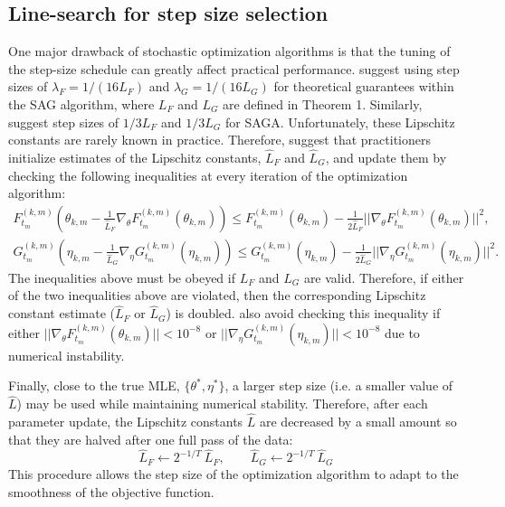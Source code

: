 
\subsection{Line-search for step size selection}
\label{subsec:est_L}

One major drawback of stochastic optimization algorithms is that the tuning of the step-size schedule can greatly affect practical performance. \citet{Schmidt:2017} suggest using step sizes of $\lambda_F = 1/(16L_F)$ and $\lambda_G = 1/(16L_G)$ for theoretical guarantees within the SAG algorithm, where $L_F$ and $L_G$ are defined in Theorem 1. Similarly, \citet{Defazio:2014} suggest step sizes of $1/3L_F$ and $1/3L_G$ for SAGA. Unfortunately, these Lipschitz constants are rarely known in practice. Therefore, \citet{Schmidt:2017} suggest that practitioners initialize estimates of the Lipschitz constants, $\hat L_F$ and $\hat L_G$, and update them by checking the following inequalities at every iteration of the optimization algorithm:
%
\begin{gather}
    F^{(k,m)}_{t_m}\left(\theta_{k,m} - \frac{1}{\hat L_F}\nabla_\theta F^{(k,m)}_{t_m}(\theta_{k,m})\right) \leq F^{(k,m)}_{t_m}(\theta_{k,m}) - \frac{1}{2 \hat L_F} || \nabla_\theta F^{(k,m)}_{t_m}(\theta_{k,m}) ||^2,
    \label{ineq:F} \\
    G^{(k,m)}_{t_m}\left(\eta_{k,m} - \frac{1}{\hat L_G}\nabla_\eta G^{(k,m)}_{t_m}(\eta_{k,m})\right) \leq G^{(k,m)}_{t_m}(\eta_{k,m}) - \frac{1}{2 \hat L_G} || \nabla_\eta G^{(k,m)}_{t_m}(\eta_{k,m}) ||^2.
    \label{ineq:G}
\end{gather}
%
The inequalities above must be obeyed if $L_F$ and $L_G$ are valid. Therefore, if either of the two inequalities above are violated, then the corresponding Lipschitz constant estimate ($\hat L_F$ or $\hat L_G$) is doubled. \citet{Schmidt:2017} also avoid checking this inequality if either $||\nabla_\theta F^{(k,m)}_{t_m}(\theta_{k,m})|| < 10^{-8}$ or $||\nabla_\eta G^{(k,m)}_{t_m}(\eta_{k,m})|| < 10^{-8}$ due to numerical instability. 

Finally, close to the true MLE, $\{\theta^*,\eta^*\}$, a larger step size (i.e. a smaller value of $\hat L$) may be used while maintaining numerical stability. Therefore, after each parameter update, the Lipschitz constants $\hat L$ are decreased by a small amount so that they are halved after one full pass of the data:
%
\begin{equation*}
    \hat L_F \leftarrow 2^{-1/T} ~ \hat L_F, \qquad \hat L_G \leftarrow 2^{-1/T} ~ \hat L_G
\end{equation*}
%
This procedure allows the step size of the optimization algorithm to adapt to the smoothness of the objective function.

